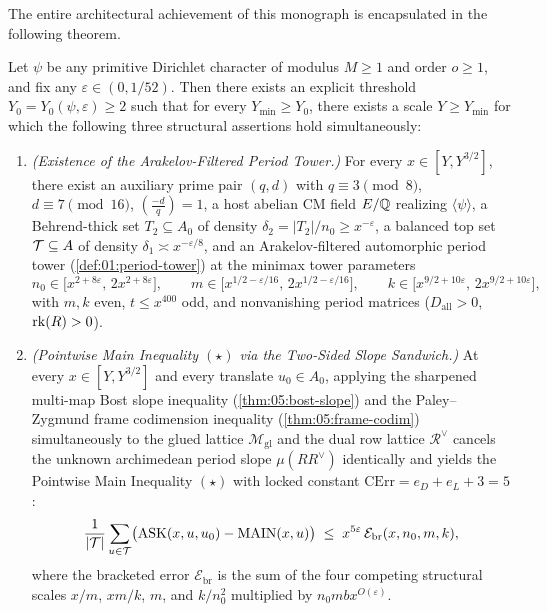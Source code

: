 The entire architectural achievement of this monograph is encapsulated in the following theorem.

\begin{theorem}
\label{thm:01:main-structural}
Let $\psi$ be any primitive Dirichlet character of modulus $M \ge 1$ and order $o \ge 1$, and fix any $\varepsilon \in (0, 1/52)$. Then there exists an explicit threshold $Y_0 = Y_0(\psi, \varepsilon) \ge 2$ such that for every $Y_{\min} \ge Y_0$, there exists a scale $Y \ge Y_{\min}$ for which the following three structural assertions hold simultaneously:
\begin{enumerate}[label=\textup{(\alph*)}]
\item \emph{(Existence of the Arakelov-Filtered Period Tower.)} For every $x \in [Y, Y^{3/2}]$, there exist an auxiliary prime pair $(q, d)$ with $q \equiv 3 \pmod 8$, $d \equiv 7 \pmod{16}$, $(\frac{-d}{q}) = 1$, a host abelian CM field $E/\mathbb{Q}$ realizing $\langle \psi \rangle$, a Behrend-thick set $T_2 \subseteq A_0$ of density $\delta_2 = |T_2|/n_0 \ge x^{-\varepsilon}$, a balanced top set $\mathcal{T} \subseteq A$ of density $\delta_1 \asymp x^{-\varepsilon/8}$, and an Arakelov-filtered automorphic period tower (\cref{def:01:period-tower}) at the minimax tower parameters
\begin{equation}
\label{eq:01:minimax-params}
  n_0 \in \bigl[x^{2+8\varepsilon},\, 2x^{2+8\varepsilon}\bigr], \qquad
  m \in \bigl[x^{1/2-\varepsilon/16},\, 2x^{1/2-\varepsilon/16}\bigr], \qquad
  k \in \bigl[x^{9/2+10\varepsilon},\, 2x^{9/2+10\varepsilon}\bigr],
\end{equation}
with $m, k$ even, $t \le x^{400}$ odd, and nonvanishing period matrices ($D_{\mathrm{all}} > 0$, $\operatorname{rk}(R) > 0$).

\item \emph{(Pointwise Main Inequality $(\star)$ via the Two-Sided Slope Sandwich.)} At every $x \in [Y, Y^{3/2}]$ and every translate $u_0 \in A_0$, applying the sharpened multi-map Bost slope inequality (\cref{thm:05:bost-slope}) and the Paley--Zygmund frame codimension inequality (\cref{thm:05:frame-codim}) simultaneously to the glued lattice $\mathcal{M}_{\mathrm{gl}}$ and the dual row lattice $\mathcal{R}^\vee$ cancels the unknown archimedean period slope $\mu(R R^\vee)$ identically and yields the Pointwise Main Inequality $(\star)$ with locked constant $\mathrm{CErr} = e_D + e_L + 3 = 5$:
\begin{equation}
\label{eq:01:star-preview}
  \frac{1}{|\mathcal{T}|}\sum_{u \in \mathcal{T}} \bigl(\mathrm{ASK}(x, u, u_0) - \mathrm{MAIN}(x, u)\bigr)
  \;\le\; x^{5\varepsilon}\,\mathcal{E}_{\mathrm{br}}(x, n_0, m, k),
\end{equation}
where the bracketed error $\mathcal{E}_{\mathrm{br}}$ is the sum of the four competing structural scales $x/m$, $xm/k$, $m$, and $k/n_0^2$ multiplied by $n_0 m b x^{O(\varepsilon)}$.


\end{enumerate}
\end{theorem}
